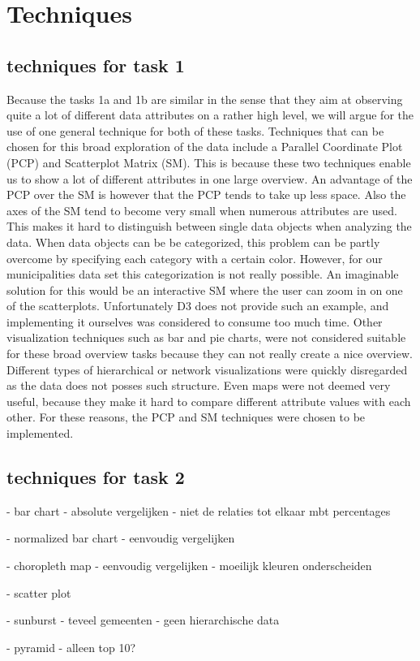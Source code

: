 \section{Techniques}

\subsection{techniques for task 1}
Because the tasks 1a and 1b are similar in the sense that they aim at observing quite a lot of different data attributes on a rather high level, we will argue for the use of one general technique for both of these tasks. Techniques that can be chosen for this broad exploration of the data include a Parallel Coordinate Plot (PCP) and Scatterplot Matrix (SM). This is because these two techniques enable us to show a lot of different attributes in one large overview. An advantage of the PCP over the SM is however that the PCP tends to take up less space. Also the axes of the SM tend to become very small when numerous attributes are used. This makes it hard to distinguish between single data objects when analyzing the data. When data objects can be be categorized, this problem can be partly overcome by specifying each category with a certain color. However, for our municipalities data set this categorization is not really possible. An imaginable solution for this would be an interactive SM where the user can zoom in on one of the scatterplots. Unfortunately D3 \cite{D3} does not provide such an example, and implementing it ourselves was considered to consume too much time.
Other visualization techniques such as bar and pie charts, were not considered suitable for these broad overview tasks because they can not really create a nice overview. Different types of hierarchical or network visualizations were quickly disregarded as the data does not posses such structure. Even maps were not deemed very useful, because they make it hard to compare different attribute values with each other. For these reasons, the PCP and SM techniques were chosen to be implemented.



\subsection{techniques for task 2}
- bar chart
 - absolute vergelijken
 - niet de relaties tot elkaar mbt percentages

- normalized bar chart
 - eenvoudig vergelijken

- choropleth map
 - eenvoudig vergelijken
 - moeilijk kleuren onderscheiden

- scatter plot

- sunburst
 - teveel gemeenten
 - geen hierarchische data

- pyramid
 - alleen top 10?



